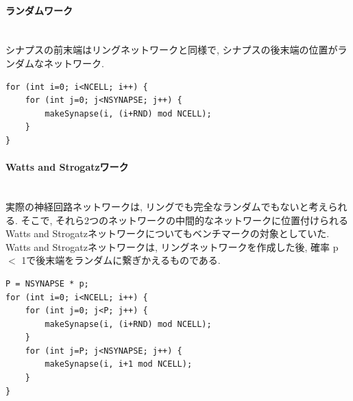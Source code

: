 \paragraph{ランダムワーク}~\\
シナプスの前末端はリングネットワークと同様で, シナプスの後末端の位置がランダムなネットワーク.
{\footnotesize
\begin{lstlisting}[numbers=none, caption=ランダムネットワークの作成]
for (int i=0; i<NCELL; i++) {
    for (int j=0; j<NSYNAPSE; j++) {
        makeSynapse(i, (i+RND) mod NCELL);
    }
}
\end{lstlisting}
}
\paragraph{Watts and Strogatzワーク}~\\
実際の神経回路ネットワークは, リングでも完全なランダムでもないと考えられる.
そこで, それら2つのネットワークの中間的なネットワークに位置付けられるWatts and Strogatzネットワークについてもベンチマークの対象としていた.
Watts and Strogatzネットワークは, リングネットワークを作成した後, 確率 p $<$ 1で後末端をランダムに繋ぎかえるものである.
{\footnotesize
\begin{lstlisting}[numbers=none, caption=Watts and Strogatzネットワークの作成]
P = NSYNAPSE * p;
for (int i=0; i<NCELL; i++) {
    for (int j=0; j<P; j++) {
        makeSynapse(i, (i+RND) mod NCELL);
    }
    for (int j=P; j<NSYNAPSE; j++) {
        makeSynapse(i, i+1 mod NCELL);
    }
}
\end{lstlisting}
}
